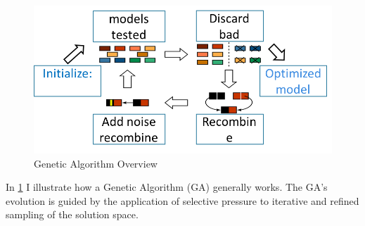 \begin{center}
\begin{figure}

    \includegraphics[width=0.7\linewidth]{figures/How_Genetic_Alg_Works.png}
  \caption{Genetic Algorithm Overview}
  \label{fig:GeneticAlgOver}
\end{figure}
  
\end{center}

In \ref{fig:GeneticAlgOver} I illustrate how a Genetic Algorithm (GA) generally works. The GA's evolution is guided by the application of selective pressure to iterative and refined sampling of the solution space.

